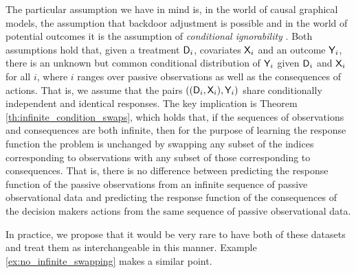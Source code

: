 The particular assumption we have in mind is, in the world of causal graphical models, the assumption that backdoor adjustment is possible and in the world of potential outcomes it is the assumption of \emph{conditional ignorability} \citep{rubin_causal_2005}. Both assumptions hold that, given a treatment $\mathsf{D}_i$, covariates $\mathsf{X}_i$ and an outcome $\mathsf{Y}_i$, there is an unknown but common conditional distribution of $\mathsf{Y}_i$ given $\mathsf{D}_i$ and $\mathsf{X}_i$ for all $i$, where $i$ ranges over passive observations as well as the consequences of actions. That is, we assume that the pairs $((\mathsf{D}_i,\mathsf{X}_i),\mathsf{Y}_i)$ share conditionally independent and identical responses. The key implication is Theorem \ref{th:infinite_condition_swaps}, which holds that, if the sequences of observations and consequences are both infinite, then for the purpose of learning the response function the problem is unchanged by swapping any subset of the indices corresponding to observations with any subset of those corresponding to consequences. That is, there is no difference between predicting the response function of the passive observations from an infinite sequence of passive observational data and predicting the response function of the consequences of the decision makers actions from the same sequence of passive observational data.

In practice, we propose that it would be very rare to have both of these datasets and treat them as interchangeable in this manner. Example \ref{ex:no_infinite_swapping} makes a similar point.

